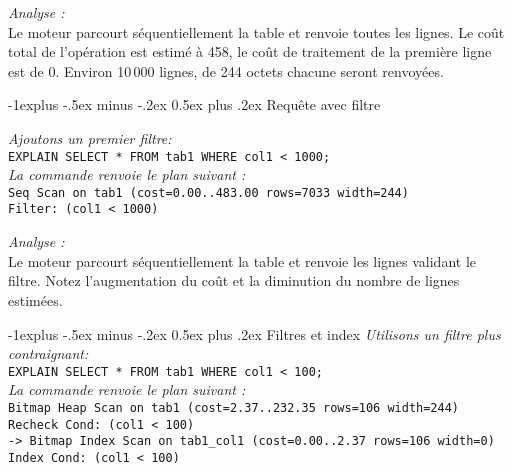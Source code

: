\documentclass[10pt,landscape, a4paper]{article}
\makeatletter
\renewcommand{\subsection}{\@startsection{subsection}{2}{0mm}%
                                {-1explus -.5ex minus -.2ex}%
                                {0.5ex plus .2ex}%
                                {\normalfont\normalsize\bfseries}}
\makeatother
\begin{document}
\begin{multicols}{3}
\hspace{0.25em} {\scriptsize \emph{Analyse :}}\\
{\scriptsize Le moteur \textcolor{node}{parcourt séquentiellement} \textcolor{table}{la table} et renvoie toutes les lignes. \textcolor{Mcost}{Le coût total de l'opération est estimé à 458,} \textcolor{mcost}{le coût de traitement de la première ligne est de 0.} \textcolor{rows}{Environ 10\,000 lignes,} de \textcolor{width}{244 octets chacune} seront renvoyées.}

\subsection{Requête avec filtre}

\hspace{0.25em} {\scriptsize \emph{Ajoutons un premier filtre:}}\\
\texttt{EXPLAIN SELECT * FROM tab1 WHERE col1 < 1000;}\\
\hspace{0.25em} {\scriptsize \emph{La commande renvoie le plan suivant :}}\\
\texttt{\textcolor{node}{Seq Scan} on \textcolor{table}{tab1}  (cost=0.00..\textcolor{Mcost}{483.00} rows=\textcolor{rows}{7033} width=244)}\\
\texttt{Filter: \textcolor{filter}{(col1 < 1000)}}

\hspace{0.25em} {\scriptsize \emph{Analyse :}}\\
{\scriptsize Le moteur \textcolor{node}{parcourt séquentiellement} \textcolor{table}{la table} et renvoie \textcolor{filter}{les lignes validant le filtre.} Notez \textcolor{Mcost}{l'augmentation du coût} et \textcolor{rows}{la diminution du nombre de lignes estimées.}}

\subsection{Filtres et index}
\hspace{0.25em} {\scriptsize \emph{Utilisons un filtre plus contraignant:}}\\
\texttt{EXPLAIN SELECT * FROM tab1 WHERE col1 < 100;}\\
\hspace{0.25em} {\scriptsize \emph{La commande renvoie le plan suivant :}}\\


\texttt{\textcolor{node2}{Bitmap Heap Scan} on tab1  (cost=2.37..232.35 rows=106 width=244)
   Recheck Cond: \textcolor{filter2}{(col1 < 100)}\\
\hspace{0.25em}  ->  \textcolor{node}{Bitmap Index Scan} on \textcolor{table}{tab1\_col1}  (cost=0.00..2.37 rows=106 width=0)
         Index Cond: \textcolor{filter}{(col1 < 100)}}\\


\end{multicols}
\end{document}
